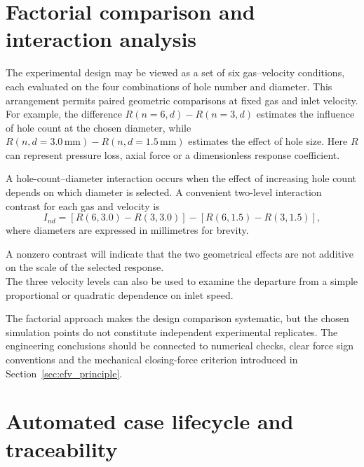 \section{Factorial comparison and interaction analysis}
\label{sec:factorial_analysis}

The experimental design may be viewed as a set of six gas--velocity conditions, each evaluated on the four combinations of hole number and diameter. This arrangement permits paired geometric comparisons at fixed gas and inlet velocity. For example, the difference $R(n=6,d)-R(n=3,d)$ estimates the influence of hole count at the chosen diameter, while $R(n,d=3.0\,\mathrm{mm})-R(n,d=1.5\,\mathrm{mm})$ estimates the effect of hole size. Here $R$ can represent pressure loss, axial force or a dimensionless response coefficient.

A hole-count--diameter interaction occurs when the effect of increasing hole count depends on which diameter is selected. A convenient two-level interaction contrast for each gas and velocity is
\begin{equation}
I_{nd}=
\left[R(6,3.0)-R(3,3.0)\right]-
\left[R(6,1.5)-R(3,1.5)\right],
\label{eq:hole_interaction}
\end{equation}
where diameters are expressed in millimetres for brevity.

A nonzero contrast will indicate that the two geometrical effects are not additive on the scale of the selected response. \\

The three velocity levels can also be used to examine the departure from a simple proportional or quadratic dependence on inlet speed.

The factorial approach makes the design comparison systematic, but the chosen simulation points do not constitute independent experimental replicates. The engineering conclusions should be connected to numerical checks, clear force sign conventions and the mechanical closing-force criterion introduced in Section~\ref{sec:efv_principle}.

\section{Automated case lifecycle and traceability}
\label{sec:case_lifecycle}


